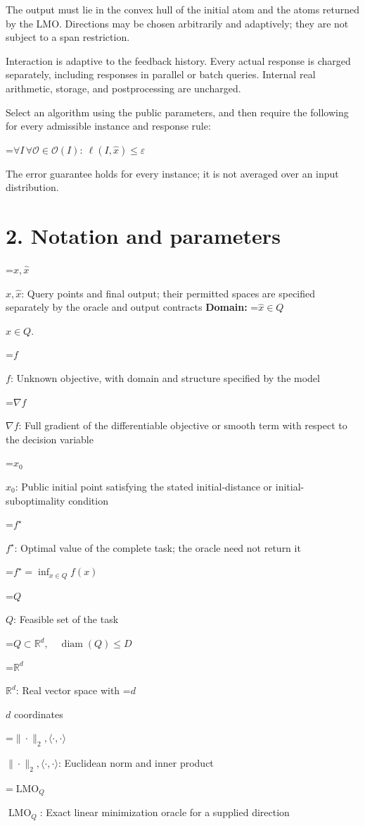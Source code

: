 \documentclass[10pt,a4paper]{article}
\newcommand{\AtlasMath}[1]{\par\begingroup\centering\setbox0=\hbox{$\displaystyle #1$}\ifdim\wd0>1.4\linewidth\typeout{ATLAS WIDE FORMULA: \the\wd0}\fi\ifdim\wd0>\linewidth\resizebox{\linewidth}{!}{\box0}\else\box0\fi\par\endgroup}
\newcommand{\AtlasInlineMath}[1]{\begingroup\setbox0=\hbox{$#1$}\ifdim\wd0>.4\linewidth\endgroup\AtlasMath{#1}\else\endgroup$#1$\fi}
\begin{document}
The output must lie in the convex hull of the initial atom and the atoms returned by the LMO. Directions may be chosen arbitrarily and adaptively; they are not subject to a span restriction.

Interaction is adaptive to the feedback history. Every actual response is charged separately, including responses in parallel or batch queries. Internal real arithmetic, storage, and postprocessing are uncharged.

Select an algorithm using the public parameters, and then require the following for every admissible instance and response rule:


\AtlasMath{\forall I\,\forall\mathcal{O}\in\mathcal{O}(I):\ \ell(I,\widehat{x})\le\varepsilon}


The error guarantee holds for every instance; it is not averaged over an input distribution.

\section{2. Notation and parameters}
\AtlasInlineMath{x,\widehat{x}}: Query points and final output; their permitted spaces are specified separately by the oracle and output contracts \textbf{Domain:} \AtlasInlineMath{\widehat{x}\in Q}.

\AtlasInlineMath{f}: Unknown objective, with domain and structure specified by the model

\AtlasInlineMath{\nabla f}: Full gradient of the differentiable objective or smooth term with respect to the decision variable

\AtlasInlineMath{x_0}: Public initial point satisfying the stated initial-distance or initial-suboptimality condition

\AtlasInlineMath{f^\star}: Optimal value of the complete task; the oracle need not return it


\AtlasMath{f^\star=\inf_{x\in Q}f(x)}


\AtlasInlineMath{Q}: Feasible set of the task


\AtlasMath{Q\subset\mathbb{R}^d,\quad\operatorname{diam}(Q)\le D}


\AtlasInlineMath{\mathbb{R}^d}: Real vector space with \AtlasInlineMath{d} coordinates

\AtlasInlineMath{\|\cdot\|_2,\langle\cdot,\cdot\rangle}: Euclidean norm and inner product

\AtlasInlineMath{\operatorname{LMO}_Q}: Exact linear minimization oracle for a supplied direction
\end{document}
